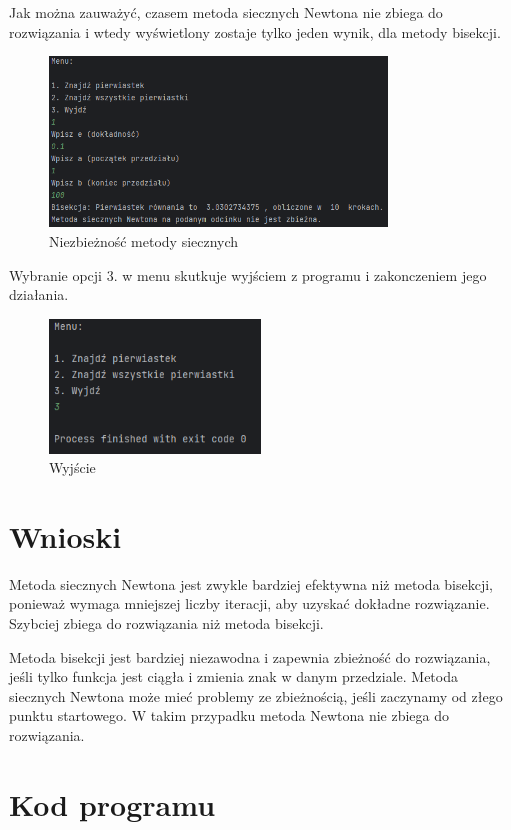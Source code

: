 \documentclass[12pt]{article}
\begin{document}
Jak można zauważyć, czasem metoda siecznych Newtona nie zbiega do rozwiązania i wtedy wyświetlony zostaje tylko jeden wynik, dla metody bisekcji.
\begin{figure}[H]
  \centering
  \includegraphics[width=0.8\textwidth]{1wynik.png}
  \caption{Niezbieżność metody siecznych}
\end{figure}
Wybranie opcji 3. w menu skutkuje wyjściem z programu i zakonczeniem jego działania.
\begin{figure}[H]
  \centering
  \includegraphics[width=0.5\textwidth]{menu3.png}
  \caption{Wyjście}
\end{figure}
\section{Wnioski}
Metoda siecznych Newtona jest zwykle bardziej efektywna niż metoda bisekcji, ponieważ wymaga mniejszej liczby iteracji, aby uzyskać dokładne rozwiązanie. Szybciej zbiega do rozwiązania niż metoda bisekcji.

Metoda bisekcji jest bardziej niezawodna i zapewnia zbieżność do rozwiązania, jeśli tylko funkcja jest ciągła i zmienia znak w danym przedziale. Metoda siecznych Newtona może mieć problemy ze zbieżnością, jeśli zaczynamy od złego punktu startowego. W takim przypadku metoda Newtona nie zbiega do rozwiązania.
\section{Kod programu}
\end{document}

